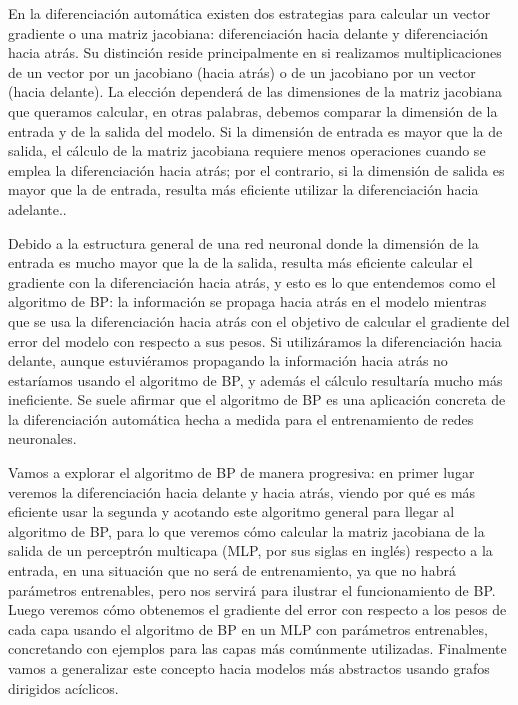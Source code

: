 En la diferenciación automática existen dos estrategias para calcular un vector gradiente o una matriz jacobiana: diferenciación hacia delante y diferenciación hacia atrás. Su distinción reside principalmente en si realizamos multiplicaciones de un vector por un jacobiano (hacia atrás) o de un jacobiano por un vector (hacia delante). La elección dependerá de las dimensiones de la matriz jacobiana que queramos calcular, en otras palabras, debemos comparar la dimensión de la entrada y de la salida del modelo. Si la dimensión de entrada es mayor que la de salida, el cálculo de la matriz jacobiana requiere menos operaciones cuando se emplea la diferenciación hacia atrás; por el contrario, si la dimensión de salida es mayor que la de entrada, resulta más eficiente utilizar la diferenciación hacia adelante.. 

Debido a la estructura general de una red neuronal donde la dimensión de la entrada es mucho mayor que la de la salida, resulta más eficiente calcular el gradiente con la diferenciación hacia atrás, y esto es lo que entendemos como el algoritmo de BP: la información se propaga hacia atrás en el modelo mientras que se usa la diferenciación hacia atrás con el objetivo de calcular el gradiente del error del modelo con respecto a sus pesos. Si utilizáramos la diferenciación hacia delante, aunque estuviéramos propagando la información hacia atrás no estaríamos usando el algoritmo de BP, y además el cálculo resultaría mucho más ineficiente. Se suele afirmar que el algoritmo de BP es una aplicación concreta de la diferenciación automática hecha a medida para el entrenamiento de redes neuronales.


Vamos a explorar el algoritmo de BP de manera progresiva: en primer lugar veremos la diferenciación hacia delante y hacia atrás, viendo por qué es más eficiente usar la segunda y acotando este algoritmo general para llegar al algoritmo de BP, para lo que veremos cómo calcular la matriz jacobiana de la salida de un perceptrón multicapa (MLP, por sus siglas en inglés) respecto a la entrada, en una situación que no será de entrenamiento, ya que no habrá parámetros entrenables, pero nos servirá para ilustrar el funcionamiento de BP. Luego veremos cómo obtenemos el gradiente del error con respecto a los pesos de cada capa usando el algoritmo de BP en un MLP con parámetros entrenables, concretando con ejemplos para las capas más comúnmente utilizadas. Finalmente vamos a generalizar este concepto hacia modelos más abstractos usando grafos dirigidos acíclicos. 


